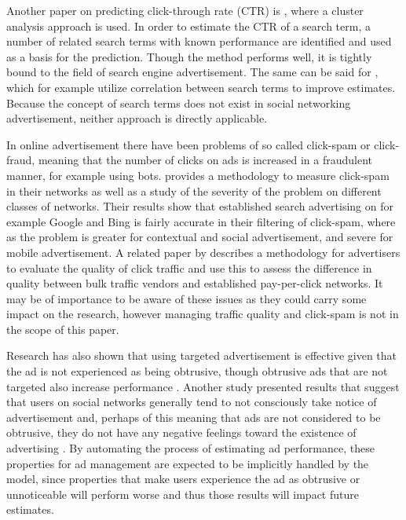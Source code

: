 \documentclass{sig-alternate}
\begin{document}
Another paper on predicting click-through rate (CTR) is \cite{Regelson2006}, where a cluster analysis approach is used. In order to estimate the CTR of a search term, a number of related search terms with known performance are identified and used as a basis for the prediction. Though the method performs well, it is tightly bound to the field of search engine advertisement. The same can be said for \cite{Richardson2007}, which for example utilize correlation between search terms to improve estimates. Because the concept of search terms does not exist in social networking advertisement, neither approach is directly applicable.

In online advertisement there have been problems of so called click-spam or click-fraud, meaning that the number of clicks on ads is increased in a fraudulent manner, for example using bots. \cite{Dave2012} provides a methodology to measure click-spam in their networks as well as a study of the severity of the problem on different classes of networks. Their results show that established search advertising on for example Google and Bing is fairly accurate in their filtering of click-spam, where as the problem is  greater for contextual and social advertisement, and severe for mobile advertisement. A related paper by \cite{Zhang2011} describes a methodology for advertisers to evaluate the quality of click traffic and use this to assess the difference in quality between bulk traffic vendors and established pay-per-click networks. It may be of importance to be aware of these issues as they could carry some impact on the research, however managing traffic quality and click-spam is not in the scope of this paper.

Research has also shown that using targeted advertisement is effective given that the ad is not experienced as being obtrusive, though obtrusive ads that are not targeted also increase performance \citep{Goldfarb2011}. Another study presented results that suggest that users on social networks generally tend to not consciously take notice of advertisement and, perhaps of this meaning that ads are not considered to be obtrusive, they do not have any negative feelings toward the existence of advertising \citep{Hadija2012}. By automating the process of estimating ad performance, these properties for ad management are expected to be implicitly handled by the model, since properties that make users experience the ad as obtrusive or unnoticeable will perform worse and thus those results will impact future estimates.
\end{document}
